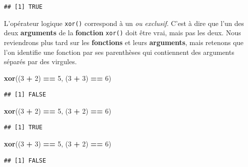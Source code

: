 \documentclass[
]{book}
\newenvironment{Shaded}{\begin{snugshade}}{\end{snugshade}}
\newcommand{\DecValTok}[1]{\textcolor[rgb]{0.00,0.00,0.81}{#1}}
\newcommand{\KeywordTok}[1]{\textcolor[rgb]{0.13,0.29,0.53}{\textbf{#1}}}
\newcommand{\NormalTok}[1]{#1}
\newcommand{\OperatorTok}[1]{\textcolor[rgb]{0.81,0.36,0.00}{\textbf{#1}}}
\newcommand{\StringTok}[1]{\textcolor[rgb]{0.31,0.60,0.02}{#1}}
\begin{document}
\begin{verbatim}
## [1] TRUE
\end{verbatim}

L'opérateur logique \texttt{xor()} correspond à un \emph{ou exclusif}. C'est à dire que l'un des deux \textbf{arguments} de la \textbf{fonction} \texttt{xor()} doit être vrai, mais pas les deux. Nous reviendrons plus tard sur les \textbf{fonctions} et leurs \textbf{arguments}, mais retenons que l'on identifie une fonction par ses parenthèses qui contiennent des arguments séparés par des virgules.

\begin{Shaded}
\begin{Highlighting}[]
\KeywordTok{xor}\NormalTok{((}\DecValTok{3} \OperatorTok{+}\StringTok{ }\DecValTok{2}\NormalTok{) }\OperatorTok{==}\StringTok{ }\DecValTok{5}\NormalTok{, (}\DecValTok{3} \OperatorTok{+}\StringTok{ }\DecValTok{3}\NormalTok{) }\OperatorTok{==}\StringTok{ }\DecValTok{6}\NormalTok{)}
\end{Highlighting}
\end{Shaded}

\begin{verbatim}
## [1] FALSE
\end{verbatim}

\begin{Shaded}
\begin{Highlighting}[]
\KeywordTok{xor}\NormalTok{((}\DecValTok{3} \OperatorTok{+}\StringTok{ }\DecValTok{2}\NormalTok{) }\OperatorTok{==}\StringTok{ }\DecValTok{5}\NormalTok{, (}\DecValTok{3} \OperatorTok{+}\StringTok{ }\DecValTok{2}\NormalTok{) }\OperatorTok{==}\StringTok{ }\DecValTok{6}\NormalTok{)}
\end{Highlighting}
\end{Shaded}

\begin{verbatim}
## [1] TRUE
\end{verbatim}

\begin{Shaded}
\begin{Highlighting}[]
\KeywordTok{xor}\NormalTok{((}\DecValTok{3} \OperatorTok{+}\StringTok{ }\DecValTok{3}\NormalTok{) }\OperatorTok{==}\StringTok{ }\DecValTok{5}\NormalTok{, (}\DecValTok{3} \OperatorTok{+}\StringTok{ }\DecValTok{2}\NormalTok{) }\OperatorTok{==}\StringTok{ }\DecValTok{6}\NormalTok{)}
\end{Highlighting}
\end{Shaded}

\begin{verbatim}
## [1] FALSE
\end{verbatim}
\end{document}
